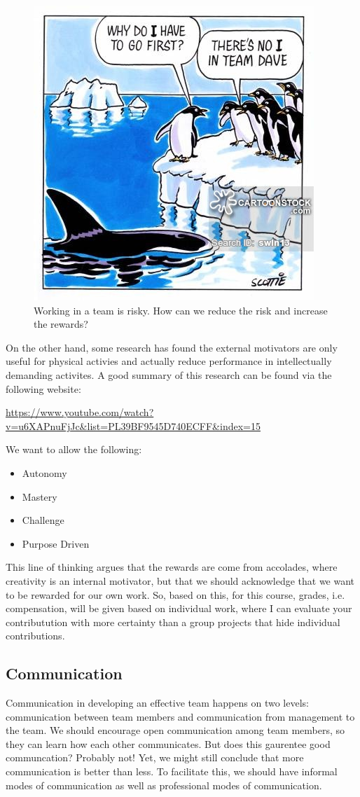 \documentclass{article}\usepackage[]{graphicx}\usepackage[]{color}
\begin{document}
\begin{figure}
\includegraphics[width=.50\textwidth]{../../Graphics/PenguinTeamWork.jpg}
\caption{Working in a team is risky. How can we reduce the risk and increase the rewards?}
\end{figure}

On the other hand, some research has found the external motivators are only useful for physical activies and actually reduce performance in intellectually demanding activites. A good summary of this research can be found via the following website:

\url{https://www.youtube.com/watch?v=u6XAPnuFjJc&list=PL39BF9545D740ECFF&index=15}

We want to allow the following: 

\begin{itemize}
  \item Autonomy
  \item Mastery
  \item Challenge
  \item Purpose Driven
\end{itemize}

This line of thinking argues that the rewards are come from accolades, where creativity is an internal motivator, but that we should acknowledge that we want to be rewarded for our own work. So, based on this, for this course, grades, i.e. compensation, will be given based on individual work, where I can evaluate your contributution with more certainty than a group projects that hide individual contributions. 

\subsection{Communication}
Communication in developing an effective team happens on two levels: communication between team members and communication from management to the team. We should encourage open communication among team members, so they can learn how each other communicates. But does this gaurentee good communcation? Probably not!  Yet, we might still conclude that more communication is better than less. To facilitate this, we should have informal modes of communication as well as professional modes of communication. 
\end{document}
